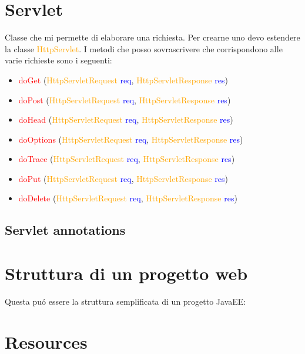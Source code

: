 \documentclass[11pt, letterpaper, titlepage]{article}
\begin{document}
\section{Servlet}
Classe che mi permette di elaborare una richiesta. Per crearne uno devo estendere la classe \textcolor{orange}{HttpServlet}.
I metodi che posso sovrascrivere che corrispondono alle varie richieste sono i seguenti:
\begin{itemize}
    \item \textcolor{red}{doGet} (\textcolor{orange}{HttpServletRequest} \textcolor{blue}{req}, \textcolor{orange}{HttpServletResponse} \textcolor{blue}{res})
    \item \textcolor{red}{doPost} (\textcolor{orange}{HttpServletRequest} \textcolor{blue}{req}, \textcolor{orange}{HttpServletResponse} \textcolor{blue}{res})
    \item \textcolor{red}{doHead} (\textcolor{orange}{HttpServletRequest} \textcolor{blue}{req}, \textcolor{orange}{HttpServletResponse} \textcolor{blue}{res})
    \item \textcolor{red}{doOptions} (\textcolor{orange}{HttpServletRequest} \textcolor{blue}{req}, \textcolor{orange}{HttpServletResponse} \textcolor{blue}{res})
    \item \textcolor{red}{doTrace} (\textcolor{orange}{HttpServletRequest} \textcolor{blue}{req}, \textcolor{orange}{HttpServletResponse} \textcolor{blue}{res})
    \item \textcolor{red}{doPut} (\textcolor{orange}{HttpServletRequest} \textcolor{blue}{req}, \textcolor{orange}{HttpServletResponse} \textcolor{blue}{res})
    \item \textcolor{red}{doDelete} (\textcolor{orange}{HttpServletRequest} \textcolor{blue}{req}, \textcolor{orange}{HttpServletResponse} \textcolor{blue}{res})
\end{itemize}

\subsection{Servlet annotations}

\newpage
\section{Struttura di un progetto web}
Questa pu\'o essere la struttura semplificata di un progetto JavaEE:


\section{Resources}
\end{document}
